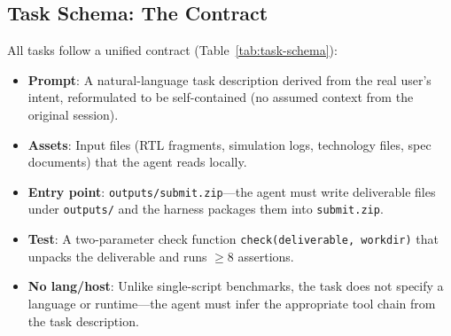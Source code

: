 \subsection{Task Schema: The \mode{} Contract}
\label{sec:task-schema}

All \Ntasks{} tasks follow a unified \mode{} contract (Table~\ref{tab:task-schema}):

\begin{itemize}
    \item \textbf{Prompt}: A natural-language task description derived from the real user's intent, reformulated to be self-contained (no assumed context from the original session).
    \item \textbf{Assets}: Input files (RTL fragments, simulation logs, technology files, spec documents) that the agent reads locally.
    \item \textbf{Entry point}: \texttt{outputs/submit.zip}---the agent must write deliverable files under \texttt{outputs/} and the harness packages them into \texttt{submit.zip}.
    \item \textbf{Test}: A two-parameter check function \texttt{check(deliverable, workdir)} that unpacks the deliverable and runs $\geq 8$ assertions.
    \item \textbf{No lang/host}: Unlike single-script benchmarks, the task does not specify a language or runtime---the agent must infer the appropriate tool chain from the task description.
\end{itemize}

